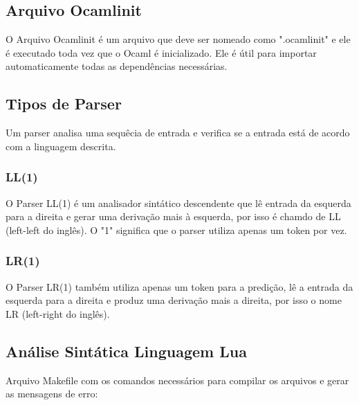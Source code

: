 \documentclass[12pt,a4paper,twoside]{report}
\begin{document}
 \subsection{Arquivo Ocamlinit}

 O Arquivo Ocamlinit é um arquivo que deve ser nomeado como ".ocamlinit" e ele é executado toda vez que o Ocaml é inicializado. Ele é útil para importar automaticamente todas as dependências necessárias.

 \subsection{Tipos de Parser}

 Um parser analisa uma sequêcia de entrada e verifica se a entrada está de acordo com a linguagem descrita.

 \subsubsection{LL(1)}

 O Parser LL(1) é um analisador sintático descendente que lê entrada da esquerda para a direita e gerar uma derivação mais à esquerda, por isso é chamdo de LL (left-left do inglês). O "1" significa que o parser utiliza apenas um token por vez.

 \subsubsection{LR(1)}

 O Parser LR(1) também utiliza apenas um token para a predição, lê a entrada da esquerda para a direita e produz uma derivação mais a direita, por isso o nome LR (left-right do inglês).


 \subsection{Análise Sintática Linguagem Lua}


 

 

 Arquivo Makefile com os comandos necessários para compilar os arquivos e gerar as mensagens de erro:

 
\end{document}
